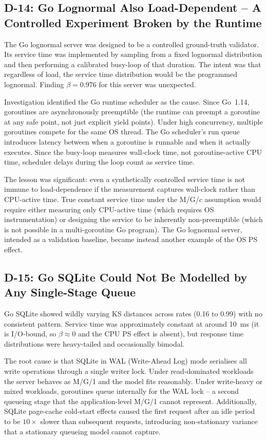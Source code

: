 \subsection{D-14: Go Lognormal Also Load-Dependent -- A Controlled Experiment Broken by the Runtime}

The Go lognormal server was designed to be a controlled ground-truth validator. Its service time was implemented by sampling from a fixed lognormal distribution and then performing a calibrated busy-loop of that duration. The intent was that regardless of load, the service time distribution would be the programmed lognormal. Finding $\beta = 0.976$ for this server was unexpected.

Investigation identified the Go runtime scheduler as the cause. Since Go~1.14, goroutines are asynchronously preemptible (the runtime can preempt a goroutine at any safe point, not just explicit yield points). Under high concurrency, multiple goroutines compete for the same OS thread. The Go scheduler's run queue introduces latency between when a goroutine is runnable and when it actually executes. Since the busy-loop measures wall-clock time, not goroutine-active CPU time, scheduler delays during the loop count as service time.

The lesson was significant: even a synthetically controlled service time is not immune to load-dependence if the measurement captures wall-clock rather than CPU-active time. True constant service time under the M/G/$c$ assumption would require either measuring only CPU-active time (which requires OS instrumentation) or designing the service to be inherently non-preemptible (which is not possible in a multi-goroutine Go program). The Go lognormal server, intended as a validation baseline, became instead another example of the OS PS effect.

\subsection{D-15: Go SQLite Could Not Be Modelled by Any Single-Stage Queue}

Go SQLite showed wildly varying KS distances across rates (0.16 to 0.99) with no consistent pattern. Service time was approximately constant at around 10~ms (it is I/O-bound, so $\beta \approx 0$ and the CPU PS effect is absent), but response time distributions were heavy-tailed and occasionally bimodal.

The root cause is that SQLite in WAL (Write-Ahead Log) mode serialises all write operations through a single writer lock. Under read-dominated workloads the server behaves as M/G/1 and the model fits reasonably. Under write-heavy or mixed workloads, goroutines queue internally for the WAL lock -- a second queueing stage that the application-level M/G/1 cannot represent. Additionally, SQLite page-cache cold-start effects caused the first request after an idle period to be $10\times$ slower than subsequent requests, introducing non-stationary variance that a stationary queueing model cannot capture.

